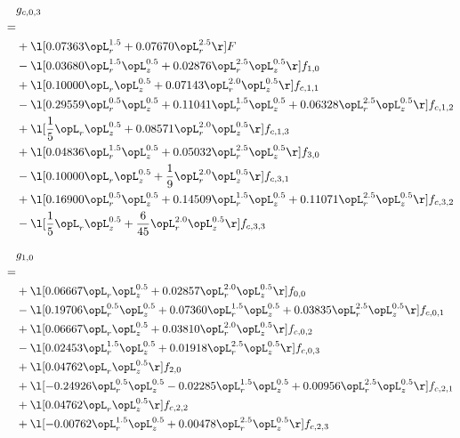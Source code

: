 \begin{alignat}{2} 
\label{eq:g_03_0} 
& g_{c,0,3} \nonumber \\ 
 = \\ 
& + \l[  0.07363 \opL_r^{1.5} +  0.07670 \opL_r^{2.5}  \r] F \nonumber \\ 
& - \l[  0.03680 \opL_r^{1.5} \opL_z^{0.5} +  0.02876 \opL_r^{2.5} \opL_z^{0.5}  \r] f_{1,0} \nonumber \\ 
& + \l[  0.10000 \opL_r \opL_z^{0.5} +  0.07143 \opL_r^{2.0} \opL_z^{0.5}  \r] f_{c,1,1} \nonumber \\ 
& - \l[  0.29559 \opL_r^{0.5} \opL_z^{0.5} +  0.11041 \opL_r^{1.5} \opL_z^{0.5} +  0.06328 \opL_r^{2.5} \opL_z^{0.5}  \r] f_{c,1,2} \nonumber \\ 
& + \l[ \frac{1}{5} \opL_r \opL_z^{0.5} +  0.08571 \opL_r^{2.0} \opL_z^{0.5}  \r] f_{c,1,3} \nonumber \\ 
& + \l[  0.04836 \opL_r^{1.5} \opL_z^{0.5} +  0.05032 \opL_r^{2.5} \opL_z^{0.5}  \r] f_{3,0} \nonumber \\ 
& - \l[  0.10000 \opL_r \opL_z^{0.5} + \frac{1}{9} \opL_r^{2.0} \opL_z^{0.5}  \r] f_{c,3,1} \nonumber \\ 
& + \l[  0.16900 \opL_r^{0.5} \opL_z^{0.5} +  0.14509 \opL_r^{1.5} \opL_z^{0.5} +  0.11071 \opL_r^{2.5} \opL_z^{0.5}  \r] f_{c,3,2} \nonumber \\ 
& - \l[ \frac{1}{5} \opL_r \opL_z^{0.5} + \frac{6}{45} \opL_r^{2.0} \opL_z^{0.5}  \r] f_{c,3,3} \nonumber \\ 
\end{alignat} 


\begin{alignat}{2} 
\label{eq:g_10_0} 
& g_{1,0} \nonumber \\ 
 = \\ 
& + \l[  0.06667 \opL_r \opL_z^{0.5} +  0.02857 \opL_r^{2.0} \opL_z^{0.5}  \r] f_{0,0} \nonumber \\ 
& - \l[  0.19706 \opL_r^{0.5} \opL_z^{0.5} +  0.07360 \opL_r^{1.5} \opL_z^{0.5} +  0.03835 \opL_r^{2.5} \opL_z^{0.5}  \r] f_{c,0,1} \nonumber \\ 
& + \l[  0.06667 \opL_r \opL_z^{0.5} +  0.03810 \opL_r^{2.0} \opL_z^{0.5}  \r] f_{c,0,2} \nonumber \\ 
& - \l[  0.02453 \opL_r^{1.5} \opL_z^{0.5} +  0.01918 \opL_r^{2.5} \opL_z^{0.5}  \r] f_{c,0,3} \nonumber \\ 
& + \l[  0.04762 \opL_r \opL_z^{0.5}  \r] f_{2,0} \nonumber \\ 
& + \l[  -0.24926 \opL_r^{0.5} \opL_z^{0.5}   -0.02285 \opL_r^{1.5} \opL_z^{0.5} +  0.00956 \opL_r^{2.5} \opL_z^{0.5}  \r] f_{c,2,1} \nonumber \\ 
& + \l[  0.04762 \opL_r \opL_z^{0.5}  \r] f_{c,2,2} \nonumber \\ 
& + \l[  -0.00762 \opL_r^{1.5} \opL_z^{0.5} +  0.00478 \opL_r^{2.5} \opL_z^{0.5}  \r] f_{c,2,3} \nonumber \\ 
\end{alignat} 


